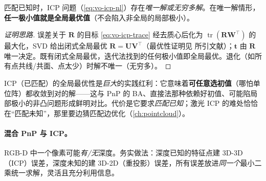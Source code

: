 \begin{theorem}
\label{thm:vo-icp-opt}
匹配已知时，ICP 问题（\cref{eq:vo-icp-nl}）存在\emph{唯一解或无穷多解}\cite{gaoxiang2019slam14}。在唯一解情形，\textbf{任一极小值就是全局最优值}（不会陷入非全局的局部极小）。
\end{theorem}
\begin{proof}[证明思路]
误差关于 $\mathbf{R}$ 的目标 \cref{eq:vo-icp-trace} 经去质心后化为 $\operatorname{tr}(\mathbf{R}\mathbf{W}^\top)$ 的最大化，SVD 给出闭式全局最优 $\mathbf{R}=\mathbf{U}\mathbf{V}^\top$（最优性证明见\cite{gaoxiang2019slam14} 所引文献）；$\mathbf{t}$ 由 $\mathbf{R}$ 唯一决定。既有闭式全局最优，迭代法找到的任何极小值即全局最优。退化（如所有点共线/共面、点太少）时解不唯一（无穷多）。
\end{proof}

\begin{insight}
ICP（已匹配）的全局最优性是\emph{巨大}的实践红利：它意味着\textbf{可任意选初值}（哪怕单位阵）都收敛到对的解——这与 PnP 的 BA、直接法那种依赖好初值、可能陷局部极小的非凸问题形成鲜明对比。代价是它要求\emph{匹配已知}；激光 ICP 的难处恰恰在“匹配未知”，那里要边猜匹配边优化（\cref{ch:pointcloud}）。
\end{insight}

\paragraph{混合 PnP 与 ICP\cite{gaoxiang2019slam14}。}RGB-D 中一个像素可能\emph{有/无}深度。务实做法：深度已知的特征点建 3D-3D（ICP）误差，深度未知的建 3D-2D（重投影）误差，所有误差放进\emph{同一个}最小二乘统一求解，灵活且充分利用信息。

